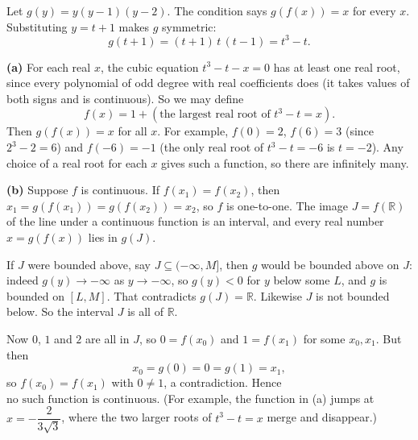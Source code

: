 Let $g(y)=y(y-1)(y-2)$. The condition says $g\left(f(x)\right)=x$ for every $x$. Substituting $y=t+1$ makes $g$ symmetric:
\[g(t+1)=(t+1)\,t\,(t-1)=t^3-t .\]

\textbf{(a)} For each real $x$, the cubic equation $t^3-t-x=0$ has at least one real root, since every polynomial of odd degree with real coefficients does (it takes values of both signs and is continuous). So we may define
\[f(x)=1+\left(\text{the largest real root of }t^3-t=x\right).\]
Then $g\left(f(x)\right)=x$ for all $x$. For example, $f(0)=2$, $f(6)=3$ (since $2^3-2=6$) and $f(-6)=-1$ (the only real root of $t^3-t=-6$ is $t=-2$). Any choice of a real root for each $x$ gives such a function, so there are infinitely many.

\textbf{(b)} Suppose $f$ is continuous. If $f(x_1)=f(x_2)$, then $x_1=g\left(f(x_1)\right)=g\left(f(x_2)\right)=x_2$, so $f$ is one-to-one. The image $J=f(\mathbb R)$ of the line under a continuous function is an interval, and every real number $x=g\left(f(x)\right)$ lies in $g(J)$.

If $J$ were bounded above, say $J\subseteq(-\infty,M]$, then $g$ would be bounded above on $J$: indeed $g(y)\to-\infty$ as $y\to-\infty$, so $g(y)<0$ for $y$ below some $L$, and $g$ is bounded on $[L,M]$. That contradicts $g(J)=\mathbb R$. Likewise $J$ is not bounded below. So the interval $J$ is all of $\mathbb R$.

Now $0$, $1$ and $2$ are all in $J$, so $0=f(x_0)$ and $1=f(x_1)$ for some $x_0,x_1$. But then
\[x_0=g(0)=0=g(1)=x_1,\]
so $f(x_0)=f(x_1)$ with $0\ne1$, a contradiction. Hence $\boxed{\text{no such function is continuous}}$. (For example, the function in (a) jumps at $x=-\dfrac{2}{3\sqrt3}$, where the two larger roots of $t^3-t=x$ merge and disappear.)
